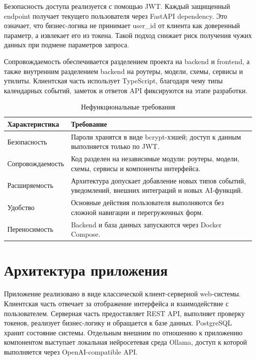 \documentclass[14pt,a4paper]{extreport}
\begin{document}
Безопасность доступа реализуется с помощью JWT. Каждый защищенный endpoint получает текущего пользователя через FastAPI dependency. Это означает, что бизнес-логика не принимает user\_id от клиента как доверенный параметр, а извлекает его из токена. Такой подход снижает риск получения чужих данных при подмене параметров запроса.

Сопровождаемость обеспечивается разделением проекта на backend и frontend, а также внутренним разделением backend на роутеры, модели, схемы, сервисы и утилиты. Клиентская часть использует TypeScript, благодаря чему типы календарных событий, заметок и ответов API фиксируются на этапе разработки.

\begin{longtable}{|p{}|p{}|}
\caption{Нефункциональные требования}\\
\hline
\textbf{Характеристика} & \textbf{Требование}\\
\hline
Безопасность & Пароли хранятся в виде bcrypt-хэшей; доступ к данным выполняется только по JWT.\\
\hline
Сопровождаемость & Код разделен на независимые модули: роутеры, модели, схемы, сервисы и компоненты интерфейса.\\
\hline
Расширяемость & Архитектура допускает добавление новых типов событий, уведомлений, внешних интеграций и новых AI-функций.\\
\hline
Удобство & Основные действия пользователя выполняются без сложной навигации и перегруженных форм.\\
\hline
Переносимость & Backend и база данных запускаются через Docker Compose.\\
\hline
\end{longtable}

\section{Архитектура приложения}

Приложение реализовано в виде классической клиент-серверной web-системы. Клиентская часть отвечает за отображение интерфейса и взаимодействие с пользователем. Серверная часть предоставляет REST API, выполняет проверку токенов, реализует бизнес-логику и обращается к базе данных. PostgreSQL хранит состояние системы. Отдельным внешним по отношению к приложению компонентом выступает локальная нейросетевая среда Ollama, доступ к которой выполняется через OpenAI-compatible API.
\end{document}
